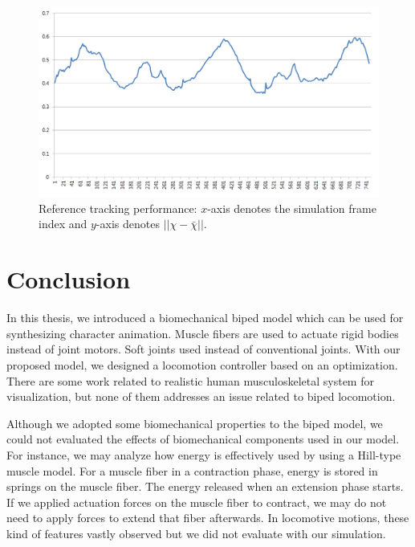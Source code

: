 \documentclass[master,english,final]{kaist-ucs}
\begin{document}
\begin{figure}[h!]
  \centering
  \includegraphics[width=5.in]{reftrack}
  \caption[Reference tracking performance]{Reference tracking performance: $x$-axis denotes the simulation frame index and $y$-axis denotes $||\chi-\bar{\chi}||$.}
  \label{fig:devi}
\end{figure}



\chapter{Conclusion}
In this thesis, we introduced a biomechanical biped model
which can be used for synthesizing character animation.
Muscle fibers are used to actuate rigid bodies instead of
joint motors. Soft joints used instead of conventional joints.
With our proposed model, we designed a locomotion controller
based on an optimization. There are some work related
to realistic human musculoskeletal system for visualization,
but none of them addresses an issue related to biped locomotion.

Although we adopted some biomechanical properties to the
biped model, we could not evaluated the effects of biomechanical
components used in our model.
For instance, we may analyze how energy is effectively
used by using a Hill-type muscle model.
For a muscle fiber in a contraction phase,
energy is stored in springs on the muscle fiber. The energy released
when an extension phase starts. If we applied actuation forces
on the muscle fiber to contract, we may do not need to
apply forces to extend that fiber afterwards.
In locomotive motions, these kind of features vastly observed
but we did not evaluate with our simulation.
\end{document}
